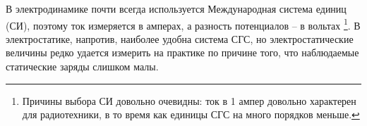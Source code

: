 
В электродинамике почти всегда используется Международная система единиц (СИ), поэтому ток измеряется в амперах, а разность потенциалов -- в вольтах \footnote{Причины выбора СИ довольно очевидны: ток в 1 ампер довольно характерен для радиотехники, в то время как единицы СГС на много порядков меньше.}. В электростатике, напротив, наиболее удобна система СГС, но электростатические величины редко удается измерить на практике по причине того, что наблюдаемые статические заряды слишком малы.
